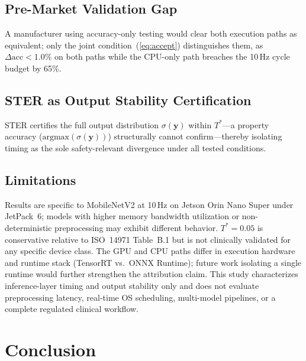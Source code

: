 \documentclass[journal,10pt,twocolumn]{IEEEtran}
\begin{document}
\subsection{Pre-Market Validation Gap}

A manufacturer using accuracy-only testing would clear both
execution paths as equivalent; only the joint condition~(\ref{eq:accept})
distinguishes them, as $\Delta\mathrm{acc}{<}1.0\%$ on both paths while
the CPU-only path breaches the 10\,Hz cycle budget by 65\%.

\subsection{STER as Output Stability Certification}

STER certifies the full output distribution $\sigma(\mathbf{y})$
within $T^*$---a property accuracy ($\mathrm{argmax}(\sigma(\mathbf{y}))$)
structurally cannot confirm---thereby isolating timing as the sole
safety-relevant divergence under all tested conditions.

\subsection{Limitations}

Results are specific to MobileNetV2 at 10\,Hz on Jetson Orin Nano Super
under JetPack~6; models with higher memory bandwidth utilization or
non-deterministic preprocessing may exhibit different behavior.
$T^*{=}0.05$ is conservative relative to ISO~14971 Table~B.1 but is
not clinically validated for any specific device class.
The GPU and CPU paths differ in execution hardware and runtime stack
(TensorRT vs.\ ONNX Runtime); future work isolating a single runtime
would further strengthen the attribution claim.
This study characterizes inference-layer timing and output stability only
and does not evaluate preprocessing latency, real-time OS scheduling,
multi-model pipelines, or a complete regulated clinical workflow.

\section{Conclusion}
\end{document}
